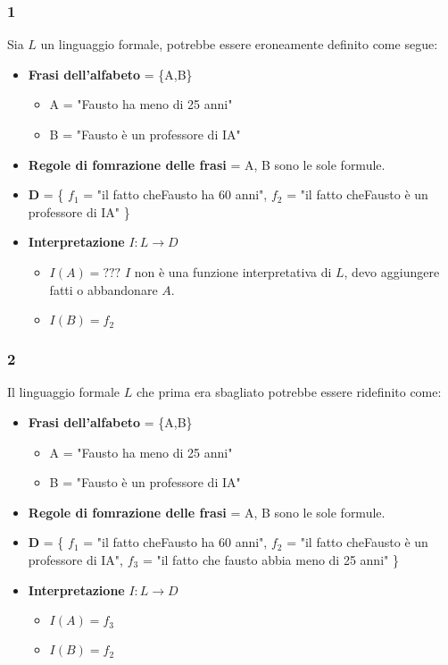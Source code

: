 \documentclass[../main.tex]{subfiles}
\begin{document}
    \subsubsection{1}
    Sia $L$ un linguaggio formale, potrebbe essere eroneamente definito come segue:
    \begin{itemize}
        \item \textbf{Frasi dell'alfabeto} = \{A,B\}
        \begin{itemize}
            \item A = "Fausto ha meno di 25 anni"
            \item B = "Fausto è un professore di IA"
        \end{itemize}
        \item \textbf{Regole di fomrazione delle frasi} = A, B sono le sole formule.
        \item \textbf{D} = \{ $f_1$ = "il fatto cheFausto ha 60 anni", $f_2$ = "il fatto cheFausto è un professore di IA" \}
        \item \textbf{Interpretazione} $I:L \to D$
        \begin{itemize}
            \item $I(A)=???$ $I$ non è una funzione interpretativa di $L$, devo aggiungere fatti o abbandonare $A$.
            \item $I(B)=f_2$
        \end{itemize}
    \end{itemize}

    \subsubsection{2}
    Il linguaggio formale $L$ che prima era sbagliato potrebbe essere ridefinito come:
    \begin{itemize}
        \item \textbf{Frasi dell'alfabeto} = \{A,B\}
        \begin{itemize}
            \item A = "Fausto ha meno di 25 anni"
            \item B = "Fausto è un professore di IA"
        \end{itemize}
        \item \textbf{Regole di fomrazione delle frasi} = A, B sono le sole formule.
        \item \textbf{D} = \{ $f_1$ = "il fatto cheFausto ha 60 anni", $f_2$ = "il fatto cheFausto è un professore di IA", $f_3$ = "il fatto che fausto abbia meno di 25 anni" \}
        \item \textbf{Interpretazione} $I:L \to D$
        \begin{itemize}
            \item $I(A)=f_3$
            \item $I(B)=f_2$
        \end{itemize}
    \end{itemize}
\end{document}
